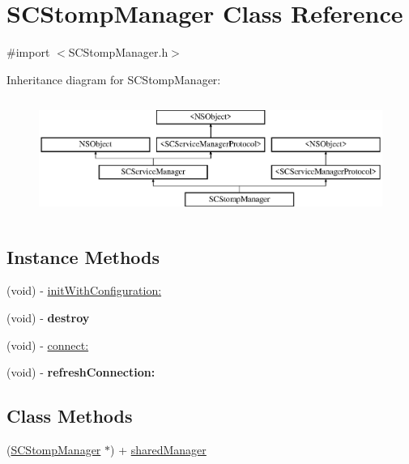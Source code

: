 \hypertarget{interface_s_c_stomp_manager}{}\section{S\+C\+Stomp\+Manager Class Reference}
\label{interface_s_c_stomp_manager}


{\ttfamily \#import $<$S\+C\+Stomp\+Manager.\+h$>$}

Inheritance diagram for S\+C\+Stomp\+Manager\+:\begin{figure}[H]
\begin{center}
\leavevmode
\includegraphics[height=3.868739cm]{interface_s_c_stomp_manager}
\end{center}
\end{figure}
\subsection*{Instance Methods}
\begin{DoxyCompactItemize}
\item 
(void) -\/ \hyperlink{interface_s_c_stomp_manager_ace0e65e96ec11fb8346e1a616c679be9}{init\+With\+Configuration\+:}
\item 
(void) -\/ {\bfseries destroy}\hypertarget{interface_s_c_stomp_manager_ac988f20733295b472465b5701e1a4f85}{}\label{interface_s_c_stomp_manager_ac988f20733295b472465b5701e1a4f85}

\item 
(void) -\/ \hyperlink{interface_s_c_stomp_manager_a4d075f599b28262924819ff445279824}{connect\+:}
\item 
(void) -\/ {\bfseries refresh\+Connection\+:}\hypertarget{interface_s_c_stomp_manager_a7eee66a251e546855b737651e8e5f6c0}{}\label{interface_s_c_stomp_manager_a7eee66a251e546855b737651e8e5f6c0}

\end{DoxyCompactItemize}
\subsection*{Class Methods}
\begin{DoxyCompactItemize}
\item 
(\hyperlink{interface_s_c_stomp_manager}{S\+C\+Stomp\+Manager} $\ast$) + \hyperlink{interface_s_c_stomp_manager_aa3a3cc7cdb68c987d0832adb12c0ef75}{shared\+Manager}
\end{DoxyCompactItemize}

